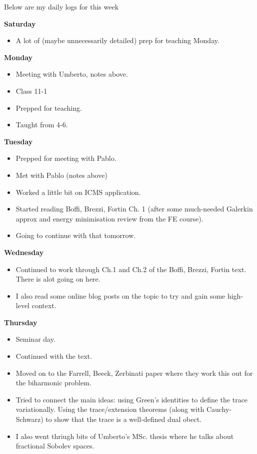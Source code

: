 \documentclass[12pt,a4paper]{article}
\begin{document}
Below are my daily logs for this week
\newline

\textbf{Saturday}
\begin{itemize}
   \item A lot of (maybe unnecessarily detailed) prep for teaching Monday. 
\end{itemize}


\textbf{Monday}

\begin{itemize}
    \item Meeting with Umberto, notes above.
    \item Class 11-1
    \item Prepped for teaching.
    \item Taught from 4-6.
\end{itemize}

\textbf{Tuesday}

\begin{itemize}
    \item Prepped for meeting with Pablo.
    \item Met with Pablo (notes above)
    \item Worked a little bit on ICMS application.
    \item Started reading Boffi, Brezzi, Fortin Ch. 1 (after some much-needed Galerkin approx and energy minimisation review from the FE course).
    \item Going to continue with that tomorrow. 
\end{itemize}

\textbf{Wednesday}

\begin{itemize}
    \item Continued to work through Ch.1 and Ch.2 of the Boffi, Brezzi, Fortin text. There is alot going on here. 
    \item I also read some online blog posts on the topic to try and gain some high-level context. 
\end{itemize}

\textbf{Thursday}
\begin{itemize}
    \item Seminar day.
    \item Continued with the text. 
    \item Moved on to the Farrell, Beeck, Zerbinati paper where they work this out for the biharmonic problem. 
    \item Tried to connect the main ideas: using Green's identities to define the trace variationally. Using the trace/extension theorems (along with Cauchy-Schwarz) to show that the trace is a well-defined dual obect. 
    \item I also went thriugh bits of Umberto's MSc. thesis where he talks about fractional Sobolev spaces.
\end{itemize}
\end{document}
